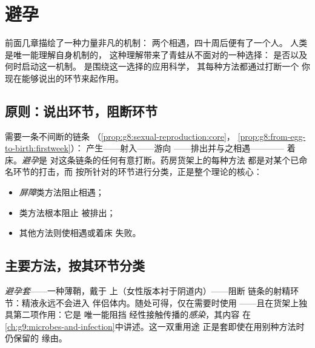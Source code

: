 \chapter{避孕}\label{ch:g8:contraception}

前面几章描绘了一种力量非凡的机制：
两个相遇，四十周后便有了一个人。
人类是唯一能理解自身机制的，
这种理解带来了青蛙从不面对的一种选择：
是否以及何时启动这一机制。
\emph{}是围绕这一选择的应用科学，
其每种方法都通过打断一个
你现在能够说出的环节来起作用。

\section{原则：说出环节，阻断环节}

\begin{proposition}[避孕与机制相对应]\label{prop:g8:contraception:principle}
需要一条不间断的链条
（\cref{prop:g8:sexual-reproduction:core}，
\cref{prop:g8:from-egg-to-birth:firstweek}）：
产生——射入——游向
——排出并与之相遇————
着床。\emph{避孕}是
对这条链条的任何有意打断。药房货架上的每种方法
都是对某个已命名环节的打击，而
按所针对的环节进行分类，正是整个理论的核心：
\begin{itemize}
  \item \emph{屏障}类方法阻止相遇；
  \item \emph{}类方法根本阻止
        被排出；
  \item 其他方法则使相遇或着床
        失败。
\end{itemize}
\end{proposition}
\admitted

\section{主要方法，按其环节分类}

\begin{definition}\label{def:g8:contraception:condom}
\emph{避孕套}——一种薄鞘，戴于
上（女性版本衬于阴道内）——阻断
链条的射精环节：精液永远不会进入
伴侣体内。随处可得，仅在需要时使用
——且在货架上独具第二项作用：它是
唯一能阻挡
经性接触传播的\emph{感染}，其内容
在\cref{ch:g9:microbes-and-infection}中讲述。这一双重用途
正是套即使在用别种方法时仍保留的
缘由。
\end{definition}


